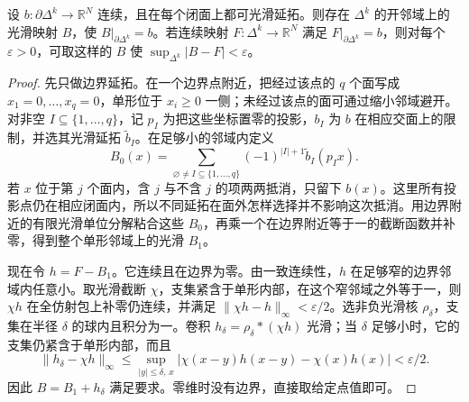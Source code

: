 \begin{lemma}\label{g2:lem:simplex-face-extension}
	设 \(b:\partial\Delta^k\to\mathbb R^N\) 连续，且在每个闭面上都可光滑延拓。则存在 \(\Delta^k\) 的开邻域上的光滑映射 \(B\)，使 \(B|_{\partial\Delta^k}=b\)。若连续映射 \(F:\Delta^k\to\mathbb R^N\) 满足 \(F|_{\partial\Delta^k}=b\)，则对每个 \(\varepsilon>0\)，可取这样的 \(B\) 使 \(\sup_{\Delta^k}|B-F|<\varepsilon\)。
\end{lemma}
\begin{proof}
	先只做边界延拓。在一个边界点附近，把经过该点的 \(q\) 个面写成 \(x_1=0,\ldots,x_q=0\)，单形位于 \(x_i\geq0\) 一侧；未经过该点的面可通过缩小邻域避开。对非空 \(I\subseteq\{1,\ldots,q\}\)，记 \(p_I\) 为把这些坐标置零的投影，\(b_I\) 为 \(b\) 在相应交面上的限制，并选其光滑延拓 \(\widetilde b_I\)。在足够小的邻域内定义
	\begin{equation}\label{g2:eq:corner-face-extension}
		B_0(x)=\sum_{\varnothing\ne I\subseteq\{1,\ldots,q\}}(-1)^{|I|+1}\widetilde b_I(p_Ix).
	\end{equation}
	若 \(x\) 位于第 \(j\) 个面内，含 \(j\) 与不含 \(j\) 的项两两抵消，只留下 \(b(x)\)。这里所有投影点仍在相应闭面内，所以不同延拓在面外怎样选择并不影响这次抵消。用边界附近的有限光滑单位分解粘合这些 \(B_0\)，再乘一个在边界附近等于一的截断函数并补零，得到整个单形邻域上的光滑 \(B_1\)。

	现在令 \(h=F-B_1\)。它连续且在边界为零。由一致连续性，\(h\) 在足够窄的边界邻域内任意小。取光滑截断 \(\chi\)，支集紧含于单形内部，在这个窄邻域之外等于一，则 \(\chi h\) 在全仿射包上补零仍连续，并满足 \(\|\chi h-h\|_\infty<\varepsilon/2\)。选非负光滑核 \(\rho_\delta\)，支集在半径 \(\delta\) 的球内且积分为一。卷积 \(h_\delta=\rho_\delta*(\chi h)\) 光滑；当 \(\delta\) 足够小时，它的支集仍紧含于单形内部，而且
	\[
		\|h_\delta-\chi h\|_\infty
		\leq\sup_{|y|\leq\delta,\,x}|\chi(x-y)h(x-y)-\chi(x)h(x)|<\varepsilon/2.
	\]
	因此 \(B=B_1+h_\delta\) 满足要求。零维时没有边界，直接取给定点值即可。
\end{proof}

